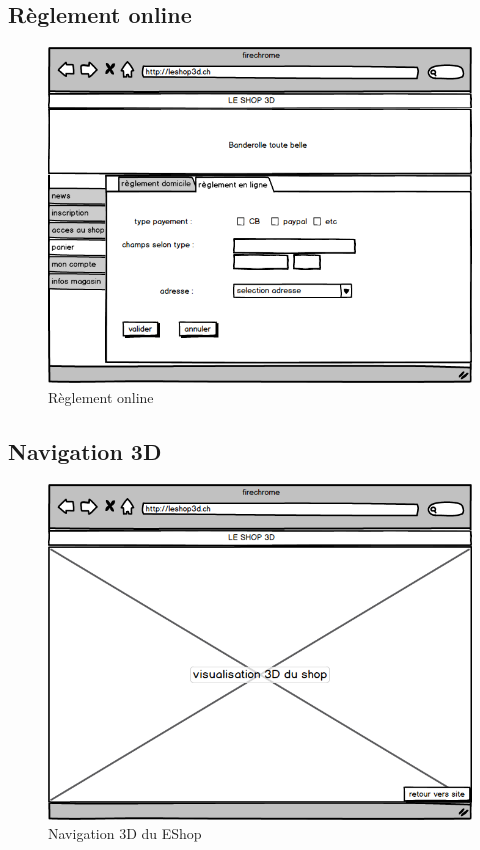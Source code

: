 \documentclass[12pt]{article}
\begin{document}
\subsection{Règlement online}

\begin{figure}[ht]
    \center
    \includegraphics[scale=0.6]{../Maquettes/reglement_online.jpeg}
    \caption*{Règlement online}
\end{figure}


\subsection{Navigation 3D}

\begin{figure}[ht]
    \center
    \includegraphics[scale=0.6]{../Maquettes/nav_3D.jpeg}
    \caption*{Navigation 3D du EShop}
\end{figure}
\end{document}
